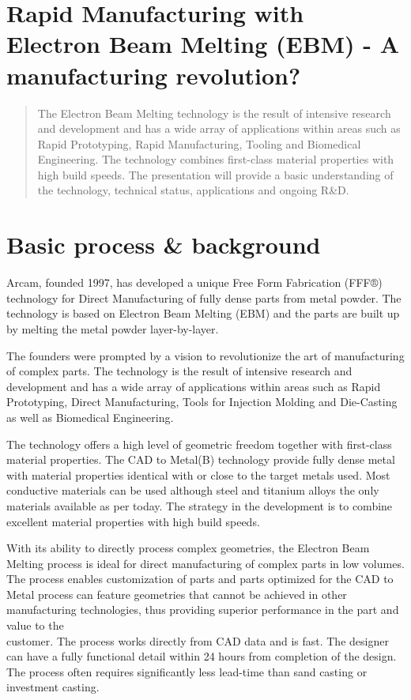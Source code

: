 \documentclass[10pt]{article}
\begin{document}
\section*{Rapid Manufacturing with Electron Beam Melting (EBM) - A manufacturing revolution? }


\begin{abstract}
The Electron Beam Melting technology is the result of intensive research and development and has a wide array of applications within areas such as Rapid Prototyping, Rapid Manufacturing, Tooling and Biomedical Engineering. The technology combines first-class material properties with high build speeds. The presentation will provide a basic understanding of the technology, technical status, applications and ongoing R\&D.
\end{abstract}

\section*{Basic process \& background}
Arcam, founded 1997, has developed a unique Free Form Fabrication (FFF®) technology for Direct Manufacturing of fully dense parts from metal powder. The technology is based on Electron Beam Melting (EBM) and the parts are built up by melting the metal powder layer-by-layer.

The founders were prompted by a vision to revolutionize the art of manufacturing of complex parts. The technology is the result of intensive research and development and has a wide array of applications within areas such as Rapid Prototyping, Direct Manufacturing, Tools for Injection Molding and Die-Casting as well as Biomedical Engineering.

The technology offers a high level of geometric freedom together with first-class material properties. The CAD to Metal(B) technology provide fully dense metal with material properties identical with or close to the target metals used. Most conductive materials can be used although steel and titanium alloys the only materials available as per today. The strategy in the development is to combine excellent material properties with high build speeds.

With its ability to directly process complex geometries, the Electron Beam Melting process is ideal for direct manufacturing of complex parts in low volumes. The process enables customization of parts and parts optimized for the CAD to Metal process can feature geometries that cannot be achieved in other manufacturing technologies, thus providing superior performance in the part and value to the\\
customer. The process works directly from CAD data and is fast. The designer can have a fully functional detail within 24 hours from completion of the design. The process often requires significantly less lead-time than sand casting or investment casting.
\end{document}

